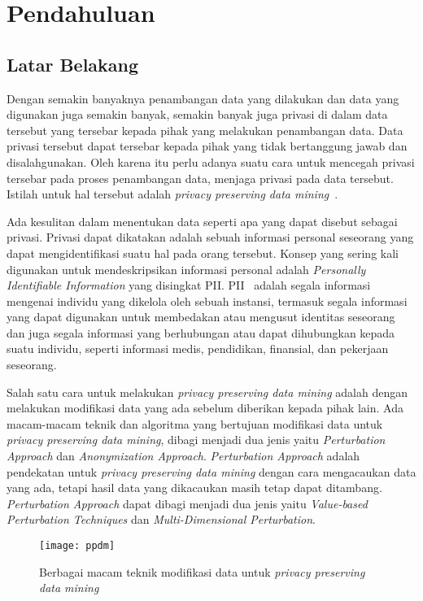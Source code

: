 \chapter{Pendahuluan}
\label{chap:intro}
   
\section{Latar Belakang}
\label{sec:latar}
Dengan semakin banyaknya penambangan data yang dilakukan dan data yang digunakan juga semakin banyak, semakin banyak juga privasi di dalam data tersebut yang tersebar kepada pihak yang melakukan penambangan data. Data privasi tersebut dapat tersebar kepada pihak yang tidak bertanggung jawab dan disalahgunakan. Oleh karena itu perlu adanya suatu cara untuk mencegah privasi tersebar pada proses penambangan data, menjaga privasi pada data tersebut. Istilah untuk hal tersebut adalah \textit{privacy preserving data mining}~\cite{rezaseifi:11:ppdm}.

Ada kesulitan dalam menentukan data seperti apa yang dapat disebut sebagai privasi. Privasi dapat dikatakan adalah sebuah informasi personal seseorang yang dapat mengidentifikasi suatu hal pada orang tersebut. Konsep yang sering kali digunakan untuk mendeskripsikan informasi personal adalah \textit{Personally Identifiable Information} yang disingkat PII. PII~\cite{nist:08:pii} adalah segala informasi mengenai individu yang dikelola oleh sebuah instansi, termasuk segala informasi yang dapat digunakan untuk membedakan atau mengusut identitas seseorang dan juga segala informasi yang berhubungan atau dapat dihubungkan kepada suatu individu, seperti informasi medis, pendidikan, finansial, dan pekerjaan seseorang. 

Salah satu cara untuk melakukan \textit{privacy preserving data mining} adalah dengan melakukan modifikasi data yang ada sebelum diberikan kepada pihak lain. Ada macam-macam teknik dan algoritma yang bertujuan modifikasi data untuk \textit{privacy preserving data mining}, dibagi menjadi dua jenis yaitu \textit{Perturbation Approach} dan \textit{Anonymization Approach}. \textit{Perturbation Approach} adalah pendekatan untuk \textit{privacy preserving data mining} dengan cara mengacaukan data yang ada, tetapi hasil data yang dikacaukan masih tetap dapat ditambang. \textit{Perturbation Approach} dapat dibagi menjadi dua jenis yaitu \textit{Value-based Perturbation Techniques} dan \textit{Multi-Dimensional Perturbation}.

\begin{figure}
	\centering
	\texttt{[image: ppdm]}
	\caption{Berbagai macam teknik modifikasi data untuk \textit{privacy preserving data mining}}
	\label{fig:ppdm}
\end{figure}

